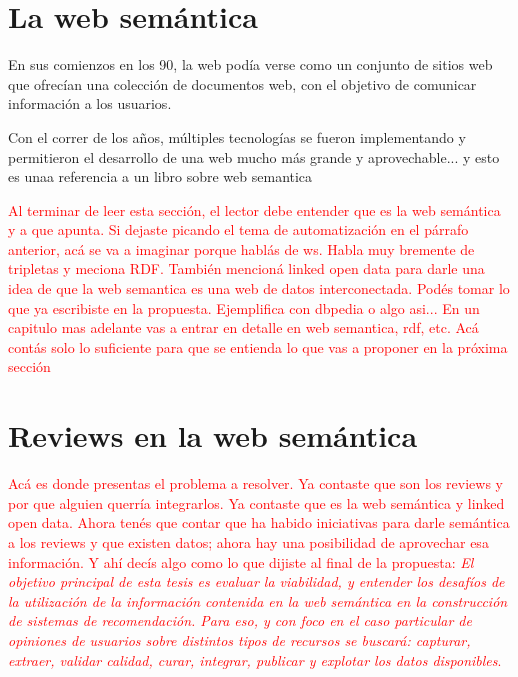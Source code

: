 \section{La web semántica}
\label{section:la-web-semantica}
En sus comienzos en los 90, la web podía verse como un conjunto de sitios web que ofrecían una colección de documentos web, con el objetivo de comunicar información a los usuarios.

Con el correr de los años, múltiples tecnologías se fueron implementando y permitieron el desarrollo de una web mucho más grande y aprovechable...  y esto es unaa referencia a un libro sobre web semantica \cite{Antoniou}

\begin{framed}
\textcolor{red}{Al terminar de leer esta sección, el lector debe entender que es la web semántica y a que apunta. Si dejaste picando el tema de automatización en el párrafo anterior, acá se va a imaginar porque hablás de ws. Habla muy bremente de tripletas y meciona RDF. También mencioná linked open data para darle una idea de que la web semantica es una web de datos interconectada. Podés tomar lo que ya escribiste en la propuesta. Ejemplifica con dbpedia o algo asi... En un capitulo mas adelante vas a entrar en detalle en web semantica, rdf, etc. Acá contás solo lo suficiente para que se entienda lo que vas a proponer en la próxima sección}
\end{framed}

\section{Reviews en la web semántica}
\label{section:reviews-en-la-web}

\begin{framed}
\textcolor{red}{Acá es donde presentas el problema a resolver. Ya contaste que son los reviews y por que alguien querría integrarlos. Ya contaste que es la web semántica y linked open data. Ahora tenés que contar que ha habido iniciativas para darle semántica a los reviews y que existen datos; ahora hay una posibilidad de aprovechar esa información. Y ahí decís algo como lo que dijiste al final de la propuesta: \textit{El objetivo principal de esta tesis es evaluar la viabilidad, y entender los desafíos de la utilización de la información contenida en la web semántica en la construcción de sistemas de recomendación. Para eso, y con foco en el caso particular de opiniones de usuarios sobre distintos tipos de recursos se buscará: capturar, extraer, validar calidad, curar, integrar, publicar y explotar los datos disponibles}.}
\end{framed}

